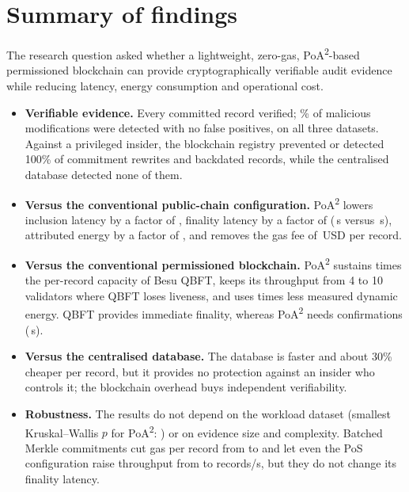 \documentclass[10pt]{article}
\newcommand{\poa}{PoA\textsuperscript{2}}
\begin{document}
\section{Summary of findings}\label{sec:summary}
The research question asked whether a lightweight, zero-gas, \poa-based permissioned blockchain can provide
cryptographically verifiable audit evidence while reducing latency, energy consumption and operational cost.
\begin{itemize}
\item \textbf{Verifiable evidence.} Every committed record verified; \TDR\% of \TamperCases{} malicious modifications
were detected with no false positives, on all three datasets. Against a privileged insider, the blockchain registry
prevented or detected 100\% of commitment rewrites and backdated records, while the centralised database detected
none of them.
\item \textbf{Versus the conventional public-chain configuration.} \poa{} lowers inclusion latency by a factor of
\InclRatioPos, finality latency by a factor of \FinalRatioPos{} (\FinalWtwoEmu\,s versus \FinalWtwoPos\,s),
attributed energy by a factor of \EattRatioPos, and removes the gas fee of \FeePos\,USD per record.
\item \textbf{Versus the conventional permissioned blockchain.} \poa{} sustains \MaxTpsRatio{} times the per-record
capacity of Besu QBFT, keeps its throughput from 4 to 10 validators where QBFT loses liveness, and uses
\EdynRatioBesu{} times less measured dynamic energy. QBFT provides immediate finality, whereas \poa{} needs
\FinalityDepth{} confirmations (\FinalWtwoEmu\,s).
\item \textbf{Versus the centralised database.} The database is faster and about 30\% cheaper per record, but it
provides no protection against an insider who controls it; the blockchain overhead buys independent verifiability.
\item \textbf{Robustness.} The results do not depend on the workload dataset (smallest Kruskal--Wallis $p$ for
\poa{}: \KWminEmu) or on evidence size and complexity. Batched Merkle commitments cut gas per record from
\GasKone{} to \GasKhundred{} and let even the PoS configuration raise throughput from \PosTpsKone{} to
\PosTpsKfifty{} records/s, but they do not change its finality latency.
\end{itemize}

\end{document}
